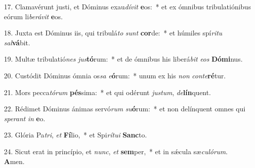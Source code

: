 17. Clamavérunt justi, et Dóminus exau\textit{dí}\textit{vit} \textbf{e}os:~*  et ex ómnibus tribulatiónibus eórum li\textit{be}\textit{rá}\textit{vit} \textbf{e}os.\

18. Juxta est Dóminus iis, qui tribulá\textit{to} \textit{sunt} \textbf{cor}de:~*  et húmiles spí\textit{ri}\textit{tu} \textit{sal}\textbf{vá}bit.\

19. Multæ tribulatió\textit{nes} \textit{jus}\textbf{tó}rum:~*  et de ómnibus his liberá\textit{bit} \textit{e}\textit{os} \textbf{Dó}\textbf{mi}nus.\

20. Custódit Dóminus ómnia os\textit{sa} \textit{e}\textbf{ó}rum:~*  unum ex his \textit{non} \textit{con}\textit{te}\textbf{ré}tur.\

21. Mors pecca\textit{tó}\textit{rum} \textbf{pés}sima:~*  et qui odérunt \textit{jus}\textit{tum}, \textit{de}\textbf{lín}quent.\

22. Rédimet Dóminus ánimas servó\textit{rum} \textit{su}\textbf{ó}rum:~*  et non delínquent omnes qui \textit{spe}\textit{rant} \textit{in} \textbf{e}o.\

23. Glória Pa\textit{tri}, \textit{et} \textbf{Fí}lio,~*  et Spi\textit{rí}\textit{tu}\textit{i} \textbf{Sanc}to.\

24. Sicut erat in princípio, et \textit{nunc}, \textit{et} \textbf{sem}per,~*  et in sǽcula sæ\textit{cu}\textit{ló}\textit{rum}. \textbf{A}men.\

